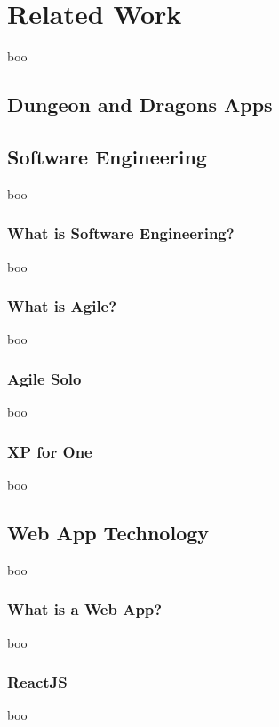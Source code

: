\documentclass[final]{cmpreport}
\begin{document}
	\section{Related Work} \label{sec:related}
	boo
	
		\subsection{Dungeon and Dragons Apps} \label{sec:other-dnd-apps}
	
		\subsection{Software Engineering} \label{sec:software-eng}
		boo
			
			\subsubsection{What is Software Engineering?} \label{sec:what-se}
			boo
				
			\subsubsection{What is Agile?} \label{sec:what-agile}
			boo
			
			\subsubsection{Agile Solo} \label{sec:agile-solo}
			boo
			
			\subsubsection{XP for One} \label{sec:xp-for-one}
			boo
			
		\subsection{Web App Technology} \label{sec:web-app}
		boo
		
			\subsubsection{What is a Web App?} \label{sec:what-web-app}
			boo
				
			\subsubsection{ReactJS} \label{sec:react-js}
			boo
			
\end{document}
